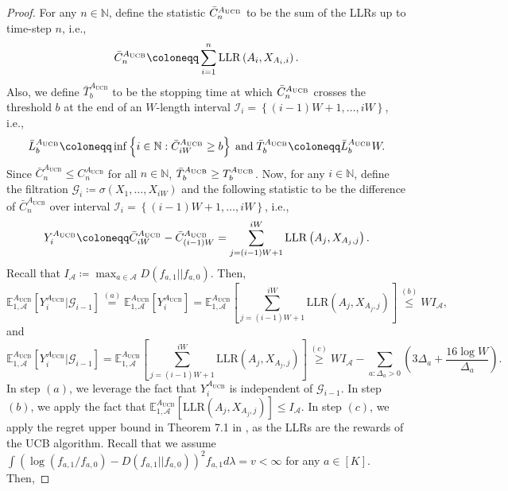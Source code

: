 \documentclass[letterpaper, 10 pt, conference]{ieeeconf}  %
\newcommand{\lp}{\left(}
\newcommand{\rp}{\right)}
\newcommand{\lb}{\left[}
\newcommand{\rb}{\right]}
\newcommand{\lbp}{\left\{}
\newcommand{\rbp}{\right\}}
\newcommand{\mcal}{\mathcal}
\newcommand{\mrm}{\mathrm}
\newcommand{\mbb}{\mathbb}
\newcommand{\E}{\mathbb{E}}
\begin{document}
\begin{proof}
For any $n \in \mbb{N}$, define the statistic $\Bar{C}_{n}^{A_{\mrm{UCB}}}$ to be the sum of the LLRs up to time-step $n$, i.e.,
%
\begin{align}\label{eq:Sum_LLR}
    \Bar{C}_{n}^{A_{\mrm{UCB}}}\coloneqq \sum_{i=1}^{n} \mrm{LLR}\lp A_{i}, X_{A_{i}, i}\rp.
\end{align}
%
Also, we define $\bar{T}_{b}^{A_{\mrm{UCB}}}$ to be the stopping time at which $\Bar{C}_{n}^{A_{\mrm{UCB}}}$ crosses the threshold $b$ at the end of an $W$-length interval $\mcal{I}_{i} = \lbp (i-1)W + 1, \dots, iW \rbp$, i.e.,
%
\begin{align}\label{eq:Sum_LLR_stop}
    \bar{L}_{b}^{A_{\mrm{UCB}}} \coloneqq \inf \lbp i \in \mbb{N}: \Bar{C}_{iW}^{A_{\mrm{UCB}}} \geq b \rbp \mrm{\; and \;} \Bar{T}_{b}^{A_{\mrm{UCB}}} \coloneqq \bar{L}_{b}^{A_{\mrm{UCB}}}W.
\end{align}
%
Since $\bar{C}_{n}^{A_{\mrm{UCB}}} \leq C_{n}^{A_{\mrm{UCB}}}$ for all $n \in \mbb{N}$, $\Bar{T}_{b}^{A_{\mrm{UCB}}} \geq T_{b}^{A_{\mrm{UCB}}}$. Now, for any $i \in \mbb{N}$, define the filtration $\mcal{G}_{i} \coloneqq \sigma \lp X_{1}, \dots, X_{iW} \rp$ and the following statistic to be the difference of $\bar{C}_{n}^{A_{\mrm{UCB}}}$ over interval $\mcal{I}_{i} = \lbp \lp i-1\rp W + 1, \dots, iW \rbp$, i.e.,
%
\begin{equation}
    Y_{i}^{A_{\mrm{UCB}}} \coloneqq \Bar{C}_{iW}^{A_{\mrm{UCB}}} - \Bar{C}_{\lp i - 1 \rp W}^{A_{\mrm{UCB}}} = \sum_{j=(i-1)W + 1}^{iW} \mrm{LLR}\lp A_{j}, X_{A_{j}, j}\rp.
\end{equation}
%
Recall that $I_{\mcal{A}} \coloneqq \max_{a \in \mcal{A}} D \lp f_{a, 1} || f_{a,0} \rp$. Then,
%
\begin{equation}
    \E_{1,\mcal{A}}^{A_{\mrm{UCB}}} \lb Y_{i}^{A_{\mrm{UCB}}} \Big| \mcal{G}_{i-1} \rb \overset{(a)}{=} \E_{1,\mcal{A}}^{A_{\mrm{UCB}}} \lb Y_{i}^{A_{\mrm{UCB}}} \rb = \E_{1,\mcal{A}}^{A_{\mrm{UCB}}} \lb \sum_{j=(i-1)W + 1}^{iW} \mrm{LLR}\lp A_{j}, X_{A_{j}, j}\rp \rb \overset{(b)}{\leq} WI_{\mcal{A}},
\end{equation}
%
and
%
\begin{equation}
    \E_{1,\mcal{A}}^{A_{\mrm{UCB}}} \lb Y_{i}^{A_{\mrm{UCB}}} | \mcal{G}_{i-1} \rb = \E_{1,\mcal{A}}^{A_{\mrm{UCB}}} \lb \sum_{j=(i-1)W + 1}^{iW} \mrm{LLR}\lp A_{j}, X_{A_{j}, j}\rp \rb \overset{(c)}{\geq} WI_{\mcal{A}} - \sum_{a: \Delta_{a} > 0} \lp 3\Delta_{a} +  \frac{16 \log W}{\Delta_{a}} \rp.
\end{equation}
%
In step $(a)$, we leverage the fact that $Y_{i}^{A_{\mrm{UCB}}}$ is independent of $\mcal{G}_{i-1}$. In step $(b)$, we apply the fact that $\E_{1,\mcal{A}}^{A_{\mrm{UCB}}} \lb \mrm{LLR}\lp A_{j}, X_{A_{j}, j}\rp \rb \leq I_{\mcal{A}}$. In step $(c)$, we apply the regret upper bound in Theorem 7.1 in \cite{lattimore2020bandit}, as the LLRs are the rewards of the UCB algorithm. Recall that we assume $\int \lp \log \lp f_{a,1} / f_{a,0} \rp - D \lp f_{a,1} || f_{a,0} \rp \rp^{2} f_{a,1}d\lambda = v < \infty$ for any $a \in \lb K \rb$. Then,

\end{proof}
\end{document}
